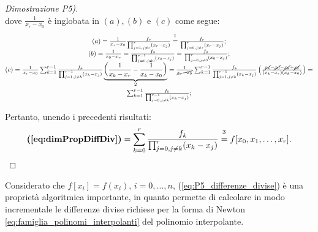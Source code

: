\begin{property}
\begin{itemize}
\begin{proof}[Dimostrazione P5)]
\begin{equation}
			\end{equation}
			dove $\frac{1}{x_r-x_0}$ è inglobata in $(a),(b)$ e $(c)$ come segue:
			\begin{equation*} 
				\begin{matrix}
					(a) = \frac{1}{x_r-x_0}\frac{f_r}{\prod_{j=1,j\neq r}^r(x_r-x_j)}\overset{\footnotemark}{=}\frac{f_r}{\prod_{j=0,j\neq r}^r(x_r-x_j)};\\
					(b) = \frac{1}{x_0-x_r}=\frac{f_0}{\prod_{j=0,j\neq 0}^{r-1}(x_0-x_j)}=\frac{f_0}{\prod_{j=0,j\neq 0}^r(x_0-x_j)};\\
					(c) = \frac{1}{x_r-x_0}\sum_{k=1}^{r-1}\frac{f_k}{\prod_{j=1,j\neq k}^{r-1}(x_k-x_j)}\underbrace{\left(\frac{1}{x_k-x_r}-\frac{1}{x_k-x_0}\right)}_{\footnotemark}=
					\frac{1}{\cancel{x_r-x_0}}\sum_{k=1}^{r-1}\frac{f_k}{\prod_{j=1,j\neq k}^{r-1}(x_k-x_j)}\left(\frac{\cancel{x_k}-\cancel{x_0}-\cancel{x_k}+\cancel{x_r}}{(x_k-x_r)(x_k-x_0)}\right)=\\
					\sum_{k=1}^{r-1}\frac{f_k}{\prod_{j=0,j\neq k}^{r-1}(x_k-x_j)};
				\end{matrix}
			\end{equation*}
			\addtocounter{footnote}{-1}
			
			Pertanto, unendo i precedenti risultati:
			\begin{equation*}
				\textbf{(\ref{eq:dimPropDiffDiv})}=\sum_{k=0}^r\frac{f_k}{\prod_{j=0,j\neq k}^r (x_k-x_j)}\overset{\footnotemark}{=} f[x_0,x_1,\hdots,x_r].
			\end{equation*}
		\end{proof}
	\end{itemize}
\end{property}

\begin{remark}[Importante]
	Considerato che $f[x_i]=f(x_i),\, i=0, \hdots, n$, (\ref{eq:P5_differenze_divise}) è  una proprietà algoritmica importante, in quanto permette di calcolare in modo incrementale le differenze divise richiese per la forma di Newton \ref{eq:famiglia_polinomi_interpolanti} del polinomio interpolante.
\end{remark}

